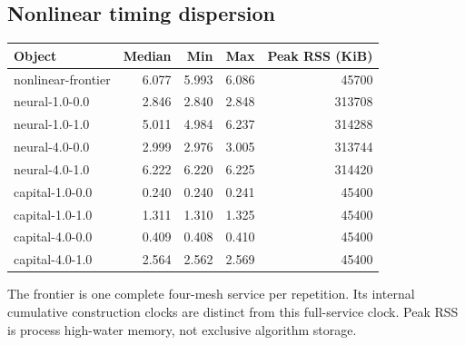 \subsection{Nonlinear timing dispersion}
\begin{tabular}{lrrrr}\toprule Object & Median & Min & Max & Peak RSS (KiB)\\\midrule
nonlinear-frontier & 6.077 & 5.993 & 6.086 & 45700\\
neural-1.0-0.0 & 2.846 & 2.840 & 2.848 & 313708\\
neural-1.0-1.0 & 5.011 & 4.984 & 6.237 & 314288\\
neural-4.0-0.0 & 2.999 & 2.976 & 3.005 & 313744\\
neural-4.0-1.0 & 6.222 & 6.220 & 6.225 & 314420\\
capital-1.0-0.0 & 0.240 & 0.240 & 0.241 & 45400\\
capital-1.0-1.0 & 1.311 & 1.310 & 1.325 & 45400\\
capital-4.0-0.0 & 0.409 & 0.408 & 0.410 & 45400\\
capital-4.0-1.0 & 2.564 & 2.562 & 2.569 & 45400\\
\bottomrule\end{tabular}
\par\medskip The frontier is one complete four-mesh service per repetition. Its internal cumulative construction clocks are distinct from this full-service clock. Peak RSS is process high-water memory, not exclusive algorithm storage.
